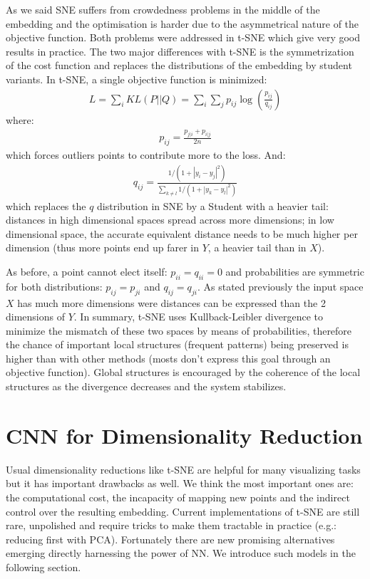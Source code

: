 \documentclass[a4paper,12pt]{report}
\newcommand{\eg}{e.g.}
\begin{document}
As we said SNE suffers from crowdedness problems in the middle of the embedding and the optimisation is harder due to the asymmetrical nature of the objective function.
Both problems were addressed in t-SNE which give very good results in practice.
The two major differences with t-SNE is the symmetrization of the cost function and replaces the distributions of the embedding by student variants.
In t-SNE, a single objective function is minimized:
\begin{eqnarray}
    L = \sum_i KL(P || Q) = \sum_i \sum_j p_{ij} \log\left(\frac{p_{ij}}{q_{ij}}\right)
\end{eqnarray}
where:
\begin{eqnarray}
    p_{ij} = \frac{p_{j|i} + p_{i|j}}{2 n}
\end{eqnarray}
which forces outliers points to contribute more to the loss.
And:
\begin{eqnarray}
    q_{ij} = \frac{1 / (1 + |y_i - y_j|^2)}{\sum_{k \not = l} 1/(1 + |y_k - y_l|^2)}
\end{eqnarray}
which replaces the $q$ distribution in SNE by a Student with a heavier tail: distances in high dimensional spaces spread across more dimensions; in low dimensional space, the accurate equivalent distance needs to be much higher per dimension (thus more points end up farer in $Y$, a heavier tail than in $X$).

As before, a point cannot elect itself: $p_{ii} = q_{ii} = 0$ and probabilities are symmetric for both distributions: $p_{ij} = p_{ji}$ and $q_{ij} = q_{ji}$.
As stated previously the input space $X$ has much more dimensions were distances can be expressed than the 2 dimensions of $Y$.
In summary, t-SNE uses Kullback-Leibler divergence to minimize the mismatch of these two spaces by means of probabilities, therefore the chance of important local structures (frequent patterns) being preserved is higher than with other methods (mosts don't express this goal through an objective function).
Global structures is encouraged by the coherence of the local structures as the divergence decreases and the system stabilizes.

\section{CNN for Dimensionality Reduction}
Usual dimensionality reductions like t-SNE are helpful for many visualizing tasks but it has important drawbacks as well.
We think the most important ones are: the computational cost, the incapacity of mapping new points and the indirect control over the resulting embedding.
Current implementations of t-SNE are still rare, unpolished and require tricks to make them tractable in practice (\eg: reducing first with PCA).
Fortunately there are new promising alternatives emerging directly harnessing the power of NN.
We introduce such models in the following section.
\end{document}
